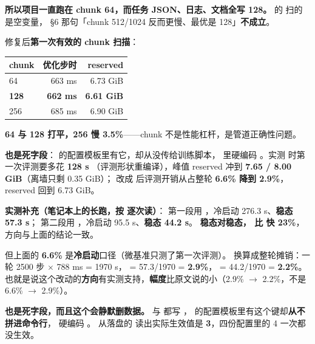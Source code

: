 \documentclass[11pt,openany]{ctexart}
\begin{document}
\textbf{所以项目一直跑在 chunk 64，而任务 JSON、日志、文档全写 128。}  的  扫的是空变量，  §6 那句「chunk 512/1024 反而更慢、最优是 128」\textbf{不成立}。

修复后\textbf{第一次有效的 chunk 扫描}：

\begin{center}
\small
{}
\begin{tabular}{lrr}
\toprule
\textbf{chunk} & \textbf{优化步时} & \textbf{reserved} \\
\midrule
64 & 663 ms & 6.73 GiB \\
\textbf{128} & \textbf{662 ms} & \textbf{6.61 GiB} \\
256 & 685 ms & 6.90 GiB \\
\bottomrule
\end{tabular}
\end{center}

\textbf{64 与 128 打平，256 慢 3.5\%}——chunk 不是性能杠杆，是管道正确性问题。

\textbf{ 也是死字段}： 的配置模板里有它，却从没传给训练脚本，  里硬编码 。实测  时第一次评测要多花 \textbf{128 s} （评测形状重编译），峰值 reserved 冲到 \textbf{7.65 / 8.00 GiB}（离墙只剩 0.35 GiB）； 改成  后评测开销从占整轮 \textbf{6.6\% 降到 2.9\%}，reserved 回到 6.73 GiB。

\begin{notebox}
\textbf{实测补充（笔记本上的长跑，按  逐次读）}： 第一段用 ，冷启动 276.3 s、\textbf{稳态 57.3 s}； 第二段用 ，冷启动 95.5 s、\textbf{稳态 44.2 s}。 \textbf{稳态对稳态， 比  快 23\%}，方向与上面的结论一致。

但上面的 \textbf{6.6\%} 是\textbf{冷启动}口径（微基准只测了第一次评测）。 换算成整轮摊销：一轮 2500 步 $\times$ 788 ms = 1970 s，  = 57.3/1970 = \textbf{2.9\%}， = 44.2/1970 = \textbf{2.2\%}。 也就是说这个改动的\textbf{方向}有实测支持，\textbf{幅度}比原文说的小（2.9\% $\rightarrow$ 2.2\%，不是 6.6\% $\rightarrow$ 2.9\%）。
\end{notebox}

\textbf{ 也是死字段，而且这个会静默删数据。}  与  都写 ，  的配置模板里有这个键却\textbf{从不拼进命令行}， 硬编码 。 从落盘的  读出实际生效值是 \textbf{3}，四份配置里的 4 一次都没生效。
\end{document}
